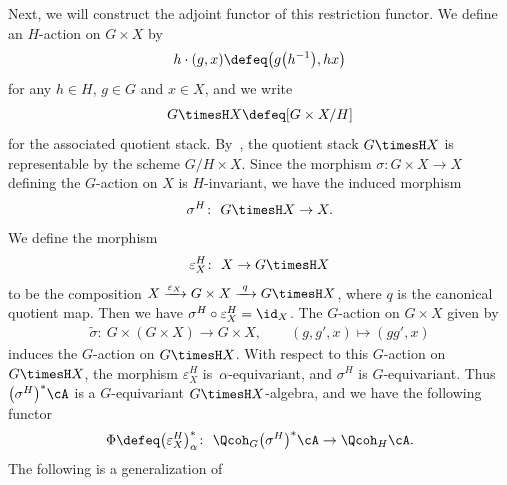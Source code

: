 Next, we will construct the adjoint functor of this restriction functor. We define an $H$-action on $G\times X$ by
\begin{gather*}
h\cdot(g,x)\defeq\big(g\big(h^{-1}\big), h x\big)
\end{gather*}
for any $h\in H$, $g\in G$ and $x\in X$, and we write
\begin{gather*}
G\timesH X\defeq[G\times X/H]
\end{gather*}
for the associated quotient stack. By~\cite[Lemma~2.16(a)]{bfk}, the quotient stack $G\timesH X$ is representable by the scheme $G/H\times X$.
Since the morphism $\sigma\colon G\times X\to X$ defining the $G$-action on $X$ is $H$-invariant, we have the induced morphism
\begin{gather*}
\sigma^H\colon\ G\timesH X\to X.
\end{gather*}
We define the morphism
\begin{gather*}
\varepsilon_X^H\colon\ X\to G\timesH X
\end{gather*}
to be the composition $X\xrightarrow{\varepsilon_X}G\times X\xrightarrow{\,\,q\,\,}G\timesH X$,
where $q$ is the canonical quotient map. Then we have $\sigma^{H}\circ\varepsilon_X^H=\id_X$. The $G$-action on $G\times X$ given by
\begin{gather}\label{3b}
\widetilde{\sigma}\colon\ G\times (G\times X)\to G\times X,\qquad
(g,g',x)\mapsto (gg',x)
\end{gather}
induces the $G$-action on $G\timesH X$. With respect to this $G$-action on $G\timesH X$, the morphism $\varepsilon_X^H$ is~$\alpha$-equivariant, and $\sigma^H$ is $G$-equivariant. Thus $\big(\sigma^H\big)^*\cA$ is a $G$-equivariant $G\timesH X$-algebra, and we have the following functor
\begin{gather*}
\Phi\defeq\big(\varepsilon_X^H\big)^*_{\alpha}\colon\ \Qcoh _G\big(\sigma^H\big)^*\cA\to \Qcoh_H\cA.
\end{gather*}
The following is a generalization of~\cite[Lemma~2.13]{bfk}

